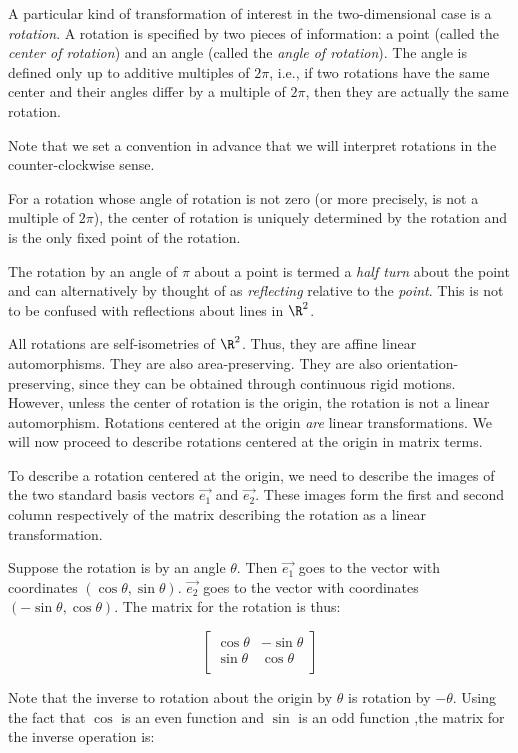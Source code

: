 \documentclass[10pt]{amsart}
\begin{document}
A particular kind of transformation of interest in the two-dimensional
case is a {\em rotation}. A rotation is specified by two pieces of
information: a point (called the {\em center of rotation}) and an
angle (called the {\em angle of rotation}). The angle is defined only
up to additive multiples of $2\pi$, i.e., if two rotations have the
same center and their angles differ by a multiple of $2\pi$, then they
are actually the same rotation.

Note that we set a convention in advance that we will interpret
rotations in the counter-clockwise sense.

For a rotation whose angle of rotation is not zero (or more precisely,
is not a multiple of $2\pi$), the center of rotation is uniquely
determined by the rotation and is the only fixed point of the
rotation.

The rotation by an angle of $\pi$ about a point is termed a {\em half
  turn} about the point and can alternatively by thought of as {\em
  reflecting} relative to the {\em point}. This is not to be confused
with reflections about lines in $\R^2$.

All rotations are self-isometries of $\R^2$. Thus, they are affine
linear automorphisms. They are also area-preserving. They are also
orientation-preserving, since they can be obtained through continuous
rigid motions. However, unless the center of rotation is the origin,
the rotation is not a linear automorphism. Rotations centered at the
origin {\em are} linear transformations. We will now proceed to
describe rotations centered at the origin in matrix terms.

To describe a rotation centered at the origin, we need to describe the
images of the two standard basis vectors $\vec{e_1}$ and
$\vec{e_2}$. These images form the first and second column
respectively of the matrix describing the rotation as a linear
transformation.

Suppose the rotation is by an angle $\theta$. Then $\vec{e_1}$ goes to
the vector with coordinates $(\cos \theta,\sin \theta)$. $\vec{e_2}$
goes to the vector with coordinates $(-\sin \theta,\cos \theta)$. The matrix for the rotation is thus:

$$\left[\begin{matrix} \cos \theta & - \sin \theta \\ \sin \theta & \cos \theta \\\end{matrix}\right]$$

Note that the inverse to rotation about the origin by $\theta$ is
rotation by $-\theta$. Using the fact that $\cos$ is an even function
and $\sin$ is an odd function ,the matrix for the inverse operation
is:
\end{document}
